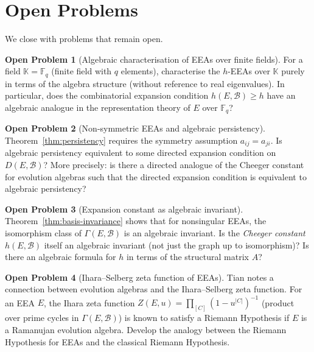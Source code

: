 \documentclass[12pt,a4paper]{amsart}
\theoremstyle{definition}
\newtheorem{problem}{Open Problem}
\newcommand{\K}{\mathbb{K}}
\newcommand{\F}{\mathbb{F}}
\newcommand{\hh}{h}          %
\newcommand{\EA}{E}          %
\newcommand{\natbasis}{\mathcal{B}}  %
\newcommand{\strmat}{A}      %
\begin{document}
\section{Open Problems}\label{sec:open}

We close with problems that remain open.

\begin{problem}[Algebraic characterisation of EEAs over finite fields]
\label{op:finite-field}
For a field $\K=\F_q$ (finite field with $q$ elements), characterise
the $h$-EEAs over $\K$ purely in terms of the algebra structure
(without reference to real eigenvalues).  In particular, does the
combinatorial expansion condition $\hh(\EA,\natbasis)\ge h$ have an
algebraic analogue in the representation theory of $\EA$ over $\F_q$?
\end{problem}

\begin{problem}[Non-symmetric EEAs and algebraic persistency]
\label{op:nonsymm}
Theorem~\ref{thm:persistency} requires the symmetry assumption
$a_{ij}=a_{ji}$.  Is algebraic persistency equivalent to some directed
expansion condition on $D(\EA,\natbasis)$?  More precisely: is there
a directed analogue of the Cheeger constant for evolution algebras such
that the directed expansion condition is equivalent to algebraic
persistency?
\end{problem}

\begin{problem}[Expansion constant as algebraic invariant]
\label{op:invariant}
Theorem~\ref{thm:basis-invariance} shows that for nonsingular EEAs, the
isomorphism class of $\varGamma(\EA,\natbasis)$ is an algebraic invariant.
Is the \emph{Cheeger constant} $\hh(\EA,\natbasis)$ itself an algebraic
invariant (not just the graph up to isomorphism)?  Is there an algebraic
formula for $\hh$ in terms of the structural matrix $\strmat$?
\end{problem}

\begin{problem}[Ihara--Selberg zeta function of EEAs]
\label{op:zeta}
Tian \cite[Section~6.2.3]{Tian2008} notes a connection between
evolution algebras and the Ihara--Selberg zeta function.  For an EEA
$\EA$, the Ihara zeta function $Z(\EA,u)=\prod_{[C]}(1-u^{|C|})^{-1}$
(product over prime cycles in $\varGamma(\EA,\natbasis)$) is known to
satisfy a Riemann Hypothesis if $\EA$ is a Ramanujan evolution algebra.
Develop the analogy between the Riemann Hypothesis for EEAs and the
classical Riemann Hypothesis.
\end{problem}
\end{document}
